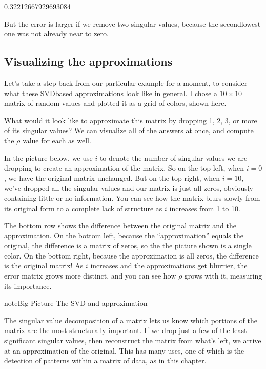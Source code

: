 \documentclass[letterpaper,10pt,english]{sphinxmanual}
\begin{document}
\begin{sphinxVerbatim}[commandchars=\\\{\}]
0.32212667929693084
\end{sphinxVerbatim}

But the error is larger if we remove two singular values, because the second\sphinxhyphen{}lowest one was not already near to zero.


\subsection{Visualizing the approximations}
\label{\detokenize{chapter-16-matrices:visualizing-the-approximations}}
Let’s take a step back from our particular example for a moment, to consider what these SVD\sphinxhyphen{}based approximations look like in general.  I chose a \(10\times10\) matrix of random values and plotted it as a grid of colors, shown here.


What would it look like to approximate this matrix by dropping 1, 2, 3, or more of its singular values?  We can visualize all of the answers at once, and compute the \(\rho\) value for each as well.

In the picture below, we use \(i\) to denote the number of singular values we are dropping to create an approximation of the matrix.  So on the top left, when \(i=0\), we have the original matrix unchanged.  But on the top right, when \(i=10\), we’ve dropped all the singular values and our matrix is just all zeros, obviously containing little or no information.  You can see how the matrix blurs slowly from its original form to a complete lack of structure as \(i\) increases from 1 to 10.


The bottom row shows the difference between the original matrix and the approximation.  On the bottom left, because the “approximation” equals the original, the difference is a matrix of zeros, so the the picture shown is a single color.  On the bottom right, because the approximation is all zeros, the difference is the original matrix!  As \(i\) increases and the approximations get blurrier, the error matrix grows more distinct, and you can see how \(\rho\) grows with it, measuring its importance.

\begin{sphinxadmonition}{note}{Big Picture \sphinxhyphen{} The SVD and approximation}

The singular value decomposition of a matrix lets us know which portions of the matrix are the most structurally important.  If we drop just a few of the least significant singular values, then reconstruct the matrix from what’s left, we arrive at an approximation of the original.  This has many uses, one of which is the detection of patterns within a matrix of data, as in this chapter.
\end{sphinxadmonition}
\end{document}
